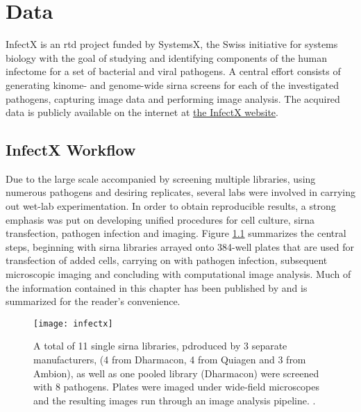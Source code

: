 \chapter{Data}

InfectX is an \gls{rtd} project funded by SystemsX, the Swiss initiative for systems biology with the goal of studying and identifying components of the human infectome for a set of bacterial and viral pathogens. A central effort consists of generating kinome- and genome-wide \gls{sirna} screens for each of the investigated pathogens, capturing image data and performing image analysis. The acquired data is publicly available on the internet at \href{http://www.infectx.ch/databrowser}{the InfectX website}.

\section{InfectX Workflow}
Due to the large scale accompanied by screening multiple libraries, using numerous pathogens and desiring replicates, several labs were involved in carrying out wet-lab experimentation. In order to obtain reproducible results, a strong emphasis was put on developing unified procedures for cell culture, \gls{sirna} transfection, pathogen infection and imaging. Figure \ref{fig:infectx} summarizes the central steps, beginning with \gls{sirna} libraries arrayed onto 384-well plates that are used for transfection of added cells, carrying on with pathogen infection, subsequent microscopic imaging and concluding with computational image analysis. Much of the information contained in this chapter has been published by \cite{Ramo2014} and is summarized for the reader's convenience.

\begin{figure}
  \centering
  \texttt{[image: infectx]}
  \caption[InfectX RNAi data acquisition and analysis workflow.]{A total of 11 single \gls{sirna} libraries, pdroduced by 3 separate manufacturers, (4 from Dharmacon, 4 from Quiagen and 3 from Ambion), as well as one pooled library (Dharmacon) were screened with 8 pathogens. Plates were imaged under wide-field microscopes and the resulting images run through an image analysis pipeline. \citep{Ramo2014}.}
  \label{fig:infectx}
\end{figure}

